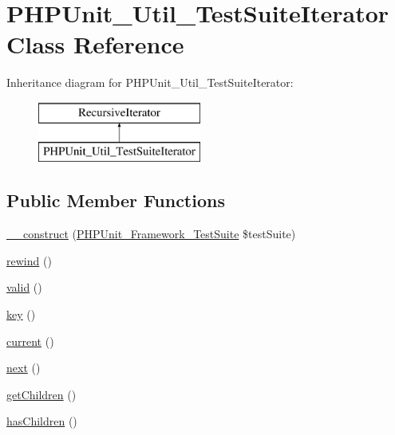 \hypertarget{class_p_h_p_unit___util___test_suite_iterator}{}\section{P\+H\+P\+Unit\+\_\+\+Util\+\_\+\+Test\+Suite\+Iterator Class Reference}
\label{class_p_h_p_unit___util___test_suite_iterator}
Inheritance diagram for P\+H\+P\+Unit\+\_\+\+Util\+\_\+\+Test\+Suite\+Iterator\+:\begin{figure}[H]
\begin{center}
\leavevmode
\includegraphics[height=2.000000cm]{class_p_h_p_unit___util___test_suite_iterator}
\end{center}
\end{figure}
\subsection*{Public Member Functions}
\begin{DoxyCompactItemize}
\item 
\mbox{\hyperlink{class_p_h_p_unit___util___test_suite_iterator_a7de4dbf7987ce90f37e15a0a620b205d}{\+\_\+\+\_\+construct}} (\mbox{\hyperlink{class_p_h_p_unit___framework___test_suite}{P\+H\+P\+Unit\+\_\+\+Framework\+\_\+\+Test\+Suite}} \$test\+Suite)
\item 
\mbox{\hyperlink{class_p_h_p_unit___util___test_suite_iterator_ae619dcf2218c21549cb65d875bbc6c9c}{rewind}} ()
\item 
\mbox{\hyperlink{class_p_h_p_unit___util___test_suite_iterator_abb9f0d6adf1eb9b3b55712056861a247}{valid}} ()
\item 
\mbox{\hyperlink{class_p_h_p_unit___util___test_suite_iterator_a729e946b4ef600e71740113c6d4332c0}{key}} ()
\item 
\mbox{\hyperlink{class_p_h_p_unit___util___test_suite_iterator_af343507d1926e6ecf964625d41db528c}{current}} ()
\item 
\mbox{\hyperlink{class_p_h_p_unit___util___test_suite_iterator_acea62048bfee7b3cd80ed446c86fb78a}{next}} ()
\item 
\mbox{\hyperlink{class_p_h_p_unit___util___test_suite_iterator_a8650a4f6150ed357d88fa043f1685ac5}{get\+Children}} ()
\item 
\mbox{\hyperlink{class_p_h_p_unit___util___test_suite_iterator_a1332d27ba1ecefa899e393e83309735e}{has\+Children}} ()
\end{DoxyCompactItemize}
